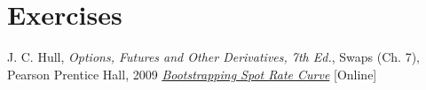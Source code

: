 \section{Exercises}


\begin{thebibliography}{9}
 J. C. Hull, \emph{Options, Futures and Other Derivatives, 7th Ed.}, Swaps (Ch. 7), Pearson Prentice Hall, 2009
 \href{https://financetrain.com/bootstrapping-spot-rate-curve-zero-curve}{\emph{Bootstrapping Spot Rate Curve}} [Online]
\end{thebibliography}
